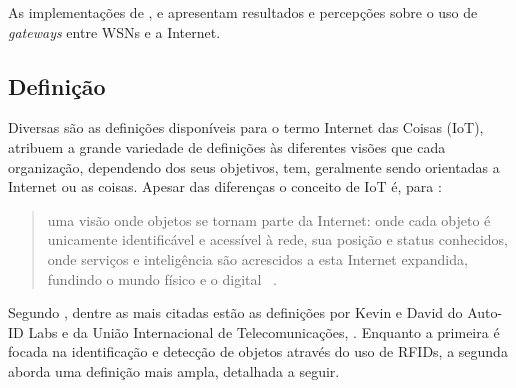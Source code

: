 \documentclass[twoside,english,brazilian]{UNISINOSmonografia}
\begin{document}
	As implementações de ,  e 
	 apresentam resultados e percepções sobre o uso de 
	\textit{gateways} entre WSNs e a Internet.

	
\subsection{Definição}
	
		Diversas são as definições disponíveis para o termo Internet das 
		Coisas (IoT),  atribuem a grande variedade de 
		definições às diferentes visões que cada organização, dependendo dos 
		seus objetivos, tem, geralmente sendo orientadas a Internet ou as 
		coisas. Apesar das diferenças o conceito de IoT é, para 
		:
		
		\begin{quote}
			uma visão onde objetos se tornam parte da Internet: onde cada 
			objeto é unicamente identificável e acessível à rede, sua posição 
			e status conhecidos, onde serviços e inteligência são acrescidos a 
			esta Internet expandida, fundindo o mundo físico e o digital~
			\cite{Coetzee2011}.
		\end{quote}
		
		Segundo , dentre as mais citadas estão as 
		definições por Kevin  e David 
		 do Auto-ID Labs e da União Internacional de 
		Telecomunicações, . Enquanto a primeira é focada na 
		identificação e detecção de objetos através do uso de RFIDs, a segunda 
		aborda uma definição mais ampla, detalhada a seguir.
		
\end{document}
